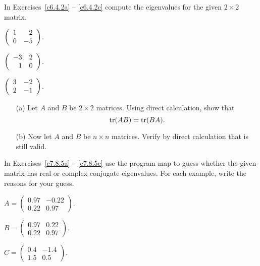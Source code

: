 \noindent In Exercises~\ref{c6.4.2a} -- \ref{c6.4.2c} compute the
eigenvalues for the given $2\times 2$ matrix.
\begin{exercise} \label{c6.4.2a}
$\left(\begin{array}{rr} 1 & 2\\ 0 &-5\end{array}\right)$.
\end{exercise}
\begin{exercise} \label{c6.4.2b}
$\left(\begin{array}{rr} -3 & 2\\ 1 &0\end{array}\right)$.
\end{exercise}
\begin{exercise} \label{c6.4.2c}
$\left(\begin{array}{rr} 3 & -2\\ 2 &-1\end{array}\right)$.
\end{exercise}

\begin{exercise} \label{c6.4.3}
\begin{itemize}
\item[(a)] Let $A$ and $B$ be $2\times 2$ matrices. Using direct
calculation, show that
\begin{equation}  \label{e:trAB=trBA}
{\rm tr}(AB) = {\rm tr}(BA).
\end{equation}
\item[(b)] Now let $A$ and $B$ be $n\times n$ matrices. Verify
by direct calculation that  is still valid.
\end{itemize}
\end{exercise}



\CEXER



\noindent In Exercises~\ref{c7.8.5a} -- \ref{c7.8.5c} use the program
{\sf map} to guess whether the given matrix has real or complex conjugate
eigenvalues.  For each example, write the reasons for your guess.
\begin{exercise} \label{c7.8.5a}
$A=\left(\begin{array}{rr} 0.97 & -0.22\\ 0.22 & 0.97
\end{array}\right)$.
\end{exercise}
\begin{exercise} \label{c7.8.5b}
$B=\left(\begin{array}{rr} 0.97 & 0.22\\ 0.22 & 0.97
\end{array}\right)$.
\end{exercise}
\begin{exercise} \label{c7.8.5c}
$C=\left(\begin{array}{rr} 0.4 & -1.4\\ 1.5 & 0.5
\end{array}\right)$.
\end{exercise}

